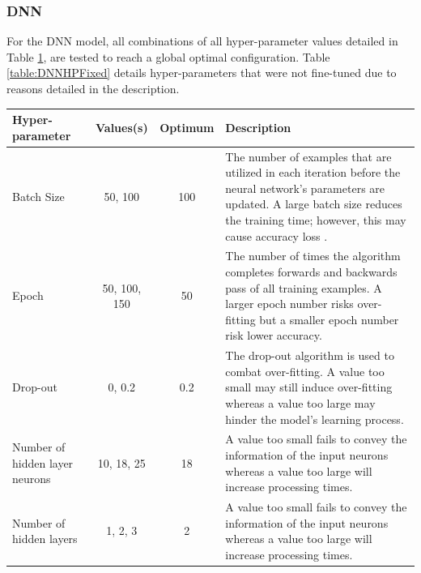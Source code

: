 \documentclass[]{interact}
\theoremstyle{plain}%
\theoremstyle{definition}
\theoremstyle{remark}
\begin{document}
\subsubsection{DNN}
For the DNN model, all combinations of all hyper-parameter values detailed in Table \ref{table:OneStepPrediction}, are tested to reach a global optimal configuration. Table \ref{table:DNNHPFixed} details hyper-parameters that were not fine-tuned due to reasons detailed in the description.
\begin{table}[H]
{\begin{tabular}{p{}ccp{}}\hline
Hyper-parameter  &  Values(s)  &  Optimum  &  Description \\ \hline
Batch Size  &  50, 100  &  100  &  The number of examples that are utilized in each iteration before the neural network's parameters are updated. A large batch size reduces the training time; however, this may cause accuracy loss \citep{SAM17}. \\ 
Epoch  &  50, 100, 150  &  50  &  The number of times the algorithm completes forwards and backwards pass of all training examples. A larger epoch number risks over-fitting but a smaller epoch number risk lower accuracy.\\ 
Drop-out  &  0, 0.2  &  0.2 &  The drop-out algorithm is used to combat over-fitting. A value too small may still induce over-fitting whereas a value too large may hinder the model's learning process. \\ 
Number of hidden layer neurons  &  10, 18, 25  &  18  &  A value too small fails to convey the information of the input neurons whereas a value too large will increase processing times.  \\ 
Number of hidden layers  &  1, 2, 3  &  2  &  A value too small fails to convey the information of the input neurons whereas a value too large will increase processing times. \\ 
\bottomrule
\end{tabular}}
\label{table:OneStepPrediction}
\end{table}
\end{document}
